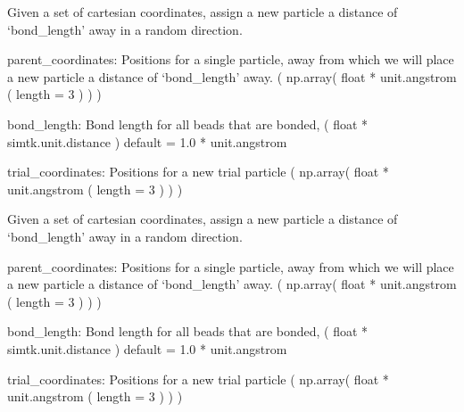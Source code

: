 \documentclass[letterpaper,12pt,english,openany,oneside]{sphinxmanual}
\begin{document}

\begin{fulllineitems}
\label{\detokenize{utilities:utilities.util.attempt_lattice_move}}
Given a set of cartesian coordinates, assign a new particle
a distance of ‘bond\_length’ away in a random direction.

parent\_coordinates: Positions for a single particle,
away from which we will place a new particle a distance
of ‘bond\_length’ away.
( np.array( float * unit.angstrom ( length = 3 ) ) )

bond\_length: Bond length for all beads that are bonded,
( float * simtk.unit.distance )
default = 1.0 * unit.angstrom

trial\_coordinates: Positions for a new trial particle
( np.array( float * unit.angstrom ( length = 3 ) ) )

\end{fulllineitems}


\begin{fulllineitems}
\label{\detokenize{utilities:utilities.util.attempt_move}}
Given a set of cartesian coordinates, assign a new particle
a distance of ‘bond\_length’ away in a random direction.

parent\_coordinates: Positions for a single particle,
away from which we will place a new particle a distance
of ‘bond\_length’ away.
( np.array( float * unit.angstrom ( length = 3 ) ) )

bond\_length: Bond length for all beads that are bonded,
( float * simtk.unit.distance )
default = 1.0 * unit.angstrom

trial\_coordinates: Positions for a new trial particle
( np.array( float * unit.angstrom ( length = 3 ) ) )

\end{fulllineitems}

\end{document}
